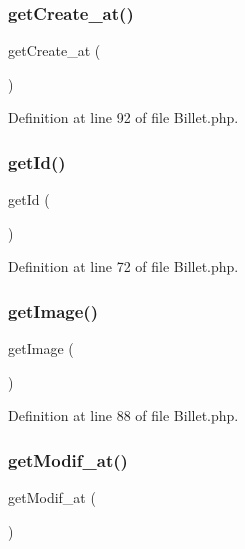\subsubsection{get\+Create\+\_\+at()}
{\footnotesize\ttfamily get\+Create\+\_\+at (\begin{DoxyParamCaption}{ }\end{DoxyParamCaption})}



Definition at line 92 of file Billet.\+php.

\mbox{\label{class_src_1_1_entity_1_1_billet_a12251d0c022e9e21c137a105ff683f13}} 
\subsubsection{get\+Id()}
{\footnotesize\ttfamily get\+Id (\begin{DoxyParamCaption}{ }\end{DoxyParamCaption})}



Definition at line 72 of file Billet.\+php.

\mbox{\label{class_src_1_1_entity_1_1_billet_a2af8add37797384585cae101fb8cbfe7}} 
\subsubsection{get\+Image()}
{\footnotesize\ttfamily get\+Image (\begin{DoxyParamCaption}{ }\end{DoxyParamCaption})}



Definition at line 88 of file Billet.\+php.

\mbox{\label{class_src_1_1_entity_1_1_billet_a5858386cc69be9863ed37e0ceb2697b1}} 
\subsubsection{get\+Modif\+\_\+at()}
{\footnotesize\ttfamily get\+Modif\+\_\+at (\begin{DoxyParamCaption}{ }\end{DoxyParamCaption})}



